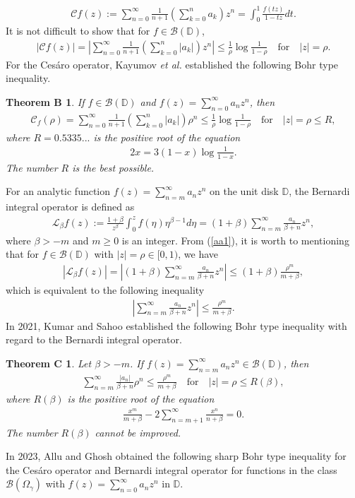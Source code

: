 \documentclass[11pt,reqno]{amsart}
\newtheorem*{theoB}{Theorem B}
\newtheorem*{theoC}{Theorem C}
\newtheorem{open problem}{Open problem}[section]
\newcommand{\beas}{\begin{eqnarray*}}
\newcommand{\eeas}{\end{eqnarray*}}
\newcommand{\bea}{\begin{eqnarray}}
\newcommand{\eea}{\end{eqnarray}}
\numberwithin{equation}{section}
\begin{document}
\bea \mathcal{C}f(z):=\sum_{n=0}^\infty \frac{1}{n+1}\left(\sum_{k=0}^n a_k\right) z^n=\int_{0}^1\frac{f(t z)}{1-t z} d t.\eea
It is not difficult to show that for $f\in\mathcal{B}(\mathbb{D})$,
\beas \vert\mathcal{C}f(z)\vert=\left\vert\sum_{n=0}^\infty \frac{1}{n+1}\left(\sum_{k=0}^n |a_k|\right) z^n\right\vert\leq \frac{1}{\rho}\log\frac{1}{1-\rho}\quad\text{for}\quad\vert z\vert=\rho.\eeas 
For the Ces\'aro operator, Kayumov {\it et al.} \cite{17} established the following Bohr type inequality.
\begin{theoB}\cite[Theorem 1, p. 616]{17} If $f\in\mathcal{B}(\mathbb{D})$ and $f(z)=\sum_{n=0}^\infty a_n z^n$, then 
\beas \mathcal{C}_f(\rho)=\sum_{n=0}^\infty \frac{1}{n+1}\left(\sum_{k=0}^n |a_k|\right) \rho^n\leq  \frac{1}{\rho}\log\frac{1}{1-\rho}\quad\text{for}\quad\vert z\vert=\rho\leq R,\eeas
where $R=0.5335...$ is the positive root of the equation 
\beas 2x=3(1-x)\log \frac{1}{1-x}.\eeas 
The number $R$ is the best possible.\end{theoB}
For an analytic function $f(z)=\sum_{n=m}^\infty a_n z^n$ on the unit disk $\mathbb{D}$, the Bernardi integral operator \cite[p. 11]{21c} is defined as
\bea\label{aa1} \mathcal{L}_\beta f(z):=\frac{1+\beta}{z^\beta}\int_0^z f(\eta) \eta^{\beta-1} d \eta=(1+\beta)\sum_{n=m}^\infty \frac{a_n}{\beta+n} z^n, \eea
where $\beta>-m$ and $m\geq 0$ is an integer. From (\ref{aa1}), it is worth to mentioning that for $f\in\mathcal{B}(\mathbb{D})$ with $|z|=\rho\in[0,1)$, we have
\beas |\mathcal{L}_\beta f(z)|=\left|(1+\beta)\sum_{n=m}^\infty \frac{a_n}{\beta+n} z^n\right|\leq (1+\beta)\frac{\rho^m}{m+ \beta},\eeas
which is equivalent to the following inequality
\beas \left|\sum_{n=m}^\infty \frac{a_n}{\beta+n} z^n\right|\leq \frac{\rho^m}{m+ \beta}.\eeas
In 2021, Kumar and Sahoo \cite{20} established the following Bohr type inequality with regard to the Bernardi integral operator.
\begin{theoC}\cite{20} Let $\beta>-m$. If $f(z)=\sum_{n=m}^\infty a_n z^n\in\mathcal{B}(\mathbb{D})$, then 
\beas \sum_{n=m}^\infty \frac{|a_n|}{\beta+n} \rho^n\leq \frac{\rho^m}{m+ \beta}\quad\text{for}\quad |z|=\rho\leq R(\beta),\eeas
where $R(\beta)$ is the positive root of the equation 
\beas\frac{x^m}{m+\beta}-2\sum_{n=m+1}^\infty \frac{x^n}{n+\beta}=0.\eeas 
The number $R(\beta)$ cannot be improved.\end{theoC}
In 2023, Allu and Ghosh \cite{5} obtained the following sharp Bohr type inequality for the Ces\'aro operator and Bernardi integral operator for functions in the class $\mathcal{B}(\Omega_{\gamma})$ with $f(z)=\sum_{n=0}^\infty a_n z^n$ in $\mathbb{D}$.
\end{document}
